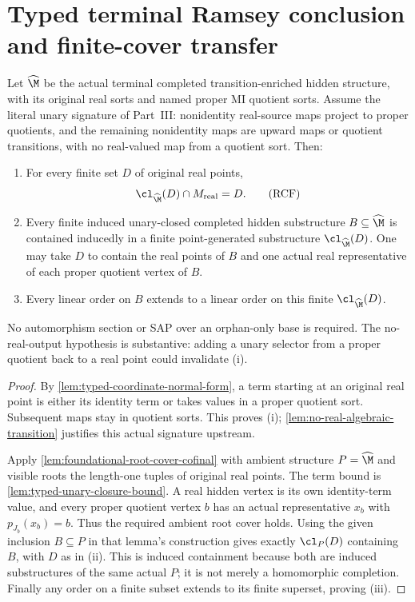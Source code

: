 \section{Typed terminal Ramsey conclusion and finite-cover transfer}
\label{sec:internal-ramsey-terminal}
\begin{lemma}
\label{lem:typed-real-root-closure-cofinal}
Let $\widehat{\M}$ be the actual terminal completed
transition-enriched hidden structure, with its original real sorts
and named proper MI quotient sorts. Assume the literal unary
signature of Part~III: nonidentity real-source maps project to
proper quotients, and the remaining nonidentity maps are upward
maps or quotient transitions, with no real-valued map from a
quotient sort. Then:
\begin{enumerate}[label=(\roman*)]
\item For every finite set $D$ of original real points,
\[
       \cl_{\widehat{\M}}(D)\cap M_{\mathrm{real}}=D.
\tag{RCF}\label{eq:typed-real-root-closure}
\]
\item Every finite induced unary-closed completed hidden
substructure $B\subseteq\widehat{\M}$ is contained inducedly
in a finite point-generated substructure
$\cl_{\widehat{\M}}(D)$. One may take $D$ to contain the real
points of $B$ and one actual real representative of each proper
quotient vertex of $B$.
\item Every linear order on $B$ extends to a linear order on
this finite $\cl_{\widehat{\M}}(D)$.
\end{enumerate}
No automorphism section or SAP over an orphan-only base is
required. The no-real-output hypothesis is substantive: adding
a unary selector from a proper quotient back to a real point
could invalidate (i).
\end{lemma}
\begin{proof}
By \cref{lem:typed-coordinate-normal-form}, a term starting at
an original real point is either its identity term or takes
values in a proper quotient sort. Subsequent maps stay in
quotient sorts. This proves (i); \cref{lem:no-real-algebraic-transition}
justifies this actual signature upstream.

Apply \cref{lem:foundational-root-cover-cofinal} with ambient
structure $P=\widehat{\M}$ and visible roots the length-one
tuples of original real points. The term bound is
\cref{lem:typed-unary-closure-bound}. A real hidden vertex is
its own identity-term value, and every proper quotient vertex
$b$ has an actual representative $x_b$ with
$p_{J_b}(x_b)=b$. Thus the required ambient root cover holds.
Using the given inclusion $B\subseteq P$ in that lemma's
construction gives exactly $\cl_P(D)$ containing $B$, with
$D$ as in (ii). This is induced containment because both are
induced substructures of the same actual $P$; it is not merely
a homomorphic completion. Finally any order on a finite subset
extends to its finite superset, proving (iii).
\end{proof}

